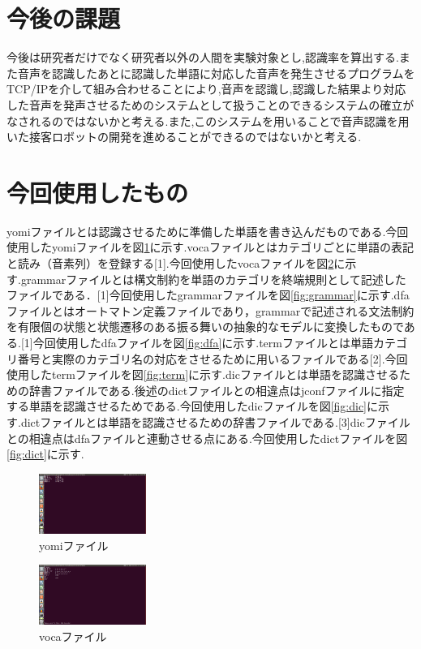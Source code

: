 \documentclass[12pt,oneside]{sotsuken_paper}
\begin{document}
\section{今後の課題}
今後は研究者だけでなく研究者以外の人間を実験対象とし,認識率を算出する.また音声を認識したあとに認識した単語に対応した音声を発生させるプログラムをTCP/IPを介して組み合わせることにより,音声を認識し,認識した結果より対応した音声を発声させるためのシステムとして扱うことのできるシステムの確立がなされるのではないかと考える.また,このシステムを用いることで音声認識を用いた接客ロボットの開発を進めることができるのではないかと考える.


\appendix
\section{今回使用したもの}
yomiファイルとは認識させるために準備した単語を書き込んだものである.今回使用したyomiファイルを図\ref{fig:yomi}に示す.vocaファイルとはカテゴリごとに単語の表記と読み（音素列）を登録する[1].今回使用したvocaファイルを図\ref{fig:voca}に示す.grammarファイルとは構文制約を単語のカテゴリを終端規則として記述したファイルである．[1]今回使用したgrammarファイルを図\ref{fig:grammar}に示す.dfaファイルとはオートマトン定義ファイルであり，grammarで記述される文法制約を有限個の状態と状態遷移のある振る舞いの抽象的なモデルに変換したものである.[1]今回使用したdfaファイルを図\ref{fig:dfa}に示す.termファイルとは単語カテゴリ番号と実際のカテゴリ名の対応をさせるために用いるファイルである[2].今回使用したtermファイルを図\ref{fig:term}に示す.dicファイルとは単語を認識させるための辞書ファイルである.後述のdictファイルとの相違点はjconfファイルに指定する単語を認識させるためである.今回使用したdicファイルを図\ref{fig:dic}に示す.dictファイルとは単語を認識させるための辞書ファイルである.[3]dicファイルとの相違点はdfaファイルと連動させる点にある.今回使用したdictファイルを図\ref{fig:dict}に示す.


\begin{figure}[htbp]
\begin{center}
\includegraphics[width=35mm]{img/yomi.png}
\caption{yomiファイル}
\label{fig:yomi}
\end{center}
\end{figure}


\begin{figure}[htbp]
\begin{center}
\includegraphics[width=35mm]{img/voca.png}
\caption{vocaファイル}
\label{fig:voca}
\end{center}
\end{figure}
\end{document}
